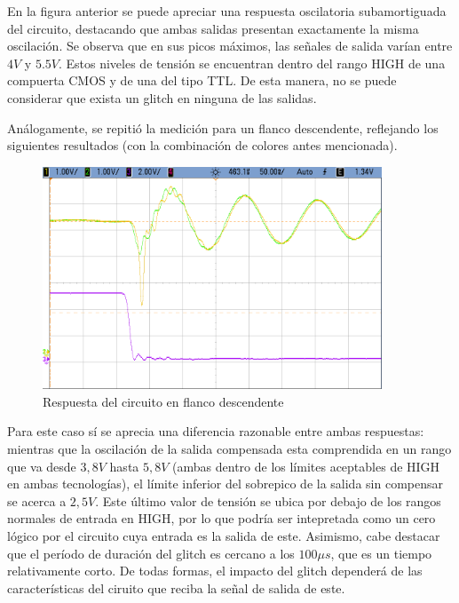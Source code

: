 En la figura anterior se puede apreciar una respuesta oscilatoria subamortiguada del circuito, destacando que ambas salidas presentan exactamente la misma oscilaci\'on. Se observa que en sus picos m\'aximos, las se\~nales de salida var\'ian entre $4V$ y $5.5V$. Estos niveles de tensi\'on se encuentran dentro del rango HIGH de una compuerta CMOS y de una del tipo TTL. De esta manera, no se puede considerar que exista un glitch en ninguna de las salidas.

An\'alogamente, se repiti\'o la medici\'on para un flanco descendente, reflejando los siguientes resultados (con la combinaci\'on de colores antes mencionada).

\begin{figure}[H]
    \centering
    \includegraphics[width=0.9\textwidth]{../EJ3/Recursos/cropped_EJ3_negative_slope_response.png}
	\caption{Respuesta del circuito en flanco descendente}
   	\label{fig:EJ3_negative_slope_response}
\end{figure}

Para este caso s\'i se aprecia una diferencia razonable entre ambas respuestas: mientras que la oscilaci\'on de la salida compensada esta comprendida en un rango que va desde $3,8V$ hasta $5,8V$ (ambas dentro de los l\'imites aceptables de HIGH en ambas tecnolog\'ias), el l\'imite inferior del sobrepico de la salida sin compensar se acerca a $2,5V$. Este \'ultimo valor de tensi\'on se ubica por debajo de los rangos normales de entrada en HIGH, por lo que podr\'ia ser intepretada como un cero l\'ogico por el circuito cuya entrada es la salida de este. Asimismo, cabe destacar que el per\'iodo de duraci\'on del glitch es cercano a los $100 \mu s$, que es un tiempo relativamente corto. De todas formas, el impacto del glitch depender\'a de las caracter\'isticas del ciruito que reciba la se\~nal de salida de este. 

